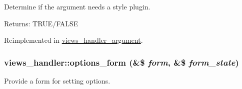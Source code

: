Determine if the argument needs a style plugin.

\begin{Desc}
\item[Returns:]TRUE/FALSE \end{Desc}


Reimplemented in \hyperlink{classviews__handler__argument_2c09abe1e98de7438ca0701a14b00861}{views\_\-handler\_\-argument}.\hypertarget{classviews__handler_a41fcf16b177eb03e35facbae6320f74}{
\subsubsection[{options\_\-form}]{\setlength{\rightskip}{0pt plus 5cm}views\_\-handler::options\_\-form (\&\$ {\em form}, \/  \&\$ {\em form\_\-state})}}
\label{classviews__handler_a41fcf16b177eb03e35facbae6320f74}


Provide a form for setting options. 

